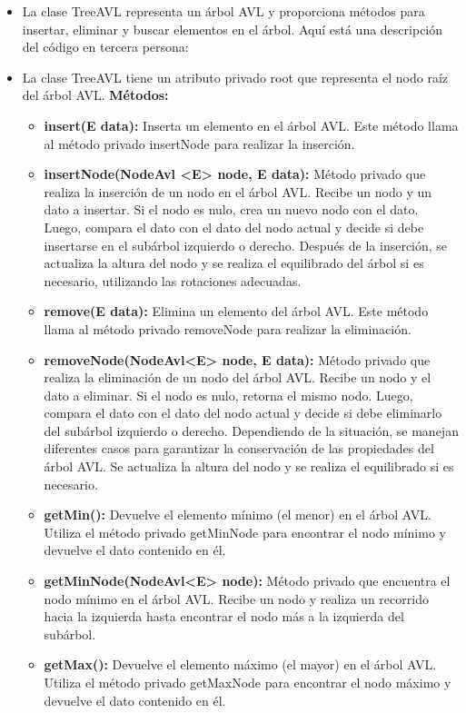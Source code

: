 \documentclass{article}
\begin{document}
	\begin{itemize}

		\item La clase TreeAVL representa un árbol AVL y proporciona métodos para insertar, eliminar y buscar elementos en el árbol. Aquí está una descripción del código en tercera persona:
		\item La clase TreeAVL tiene un atributo privado root que representa el nodo raíz del árbol AVL.
		\textbf{Métodos:}

		\begin{itemize}
			\item \textbf{insert(E data):} Inserta un elemento en el árbol AVL. Este método llama al método privado insertNode para realizar la inserción.
			\item \textbf{insertNode(NodeAvl <E> node, E data):} Método privado que realiza la inserción de un nodo en el árbol AVL. Recibe un nodo y un dato a insertar. Si el nodo es nulo, crea un nuevo nodo con el dato. Luego, compara el dato con el dato del nodo actual y decide si debe insertarse en el subárbol izquierdo o derecho. Después de la inserción, se actualiza la altura del nodo y se realiza el equilibrado del árbol si es necesario, utilizando las rotaciones adecuadas.
			\item \textbf{remove(E data):} Elimina un elemento del árbol AVL. Este método llama al método privado removeNode para realizar la eliminación.
			\item \textbf{removeNode(NodeAvl<E> node, E data):} Método privado que realiza la eliminación de un nodo del árbol AVL. Recibe un nodo y el dato a eliminar. Si el nodo es nulo, retorna el mismo nodo. Luego, compara el dato con el dato del nodo actual y decide si debe eliminarlo del subárbol izquierdo o derecho. Dependiendo de la situación, se manejan diferentes casos para garantizar la conservación de las propiedades del árbol AVL. Se actualiza la altura del nodo y se realiza el equilibrado si es necesario.
			\item \textbf{getMin():} Devuelve el elemento mínimo (el menor) en el árbol AVL. Utiliza el método privado getMinNode para encontrar el nodo mínimo y devuelve el dato contenido en él.
			\item \textbf{getMinNode(NodeAvl<E> node):} Método privado que encuentra el nodo mínimo en el árbol AVL. Recibe un nodo y realiza un recorrido hacia la izquierda hasta encontrar el nodo más a la izquierda del subárbol.
			\item \textbf{getMax():} Devuelve el elemento máximo (el mayor) en el árbol AVL. Utiliza el método privado getMaxNode para encontrar el nodo máximo y devuelve el dato contenido en él.

\end{itemize}
\end{itemize}
\end{document}

